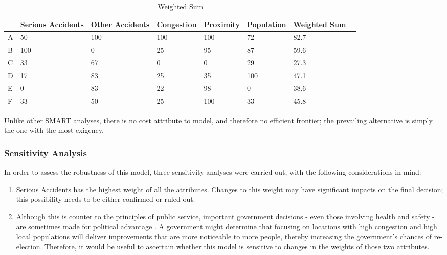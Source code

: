 \documentclass[11pt, a4paper]{article}
\begin{document}
    \begin{table}[!ht]
        \centering
        \begin{tabular}{|l|l|l|l|l|l|l|l|}
        \hline
            ~ & Serious Accidents & Other Accidents & Congestion & Proximity & Population & Weighted Sum   \\ \hline
            A & 50 & 100 & 100 & 100 & 72 & 82.7   \\ \hline
            B & 100 & 0 & 25 & 95 & 87 & 59.6   \\ \hline
            C & 33 & 67 & 0 & 0 & 29 & 27.3   \\ \hline
            D & 17 & 83 & 25 & 35 & 100 & 47.1   \\ \hline
            E & 0 & 83 & 22 & 98 & 0 & 38.6   \\ \hline
            F & 33 & 50 & 25 & 100 & 33 & 45.8   \\ \hline
        \end{tabular}
        \caption{Weighted Sum}
        \label{t10}
    \end{table}

    Unlike other SMART analyses, there is no cost attribute to model, and therefore no efficient frontier; the prevailing alternative is simply the one with the most exigency.

    \subsubsection{Sensitivity Analysis}

    In order to assess the robustness of this model, three sensitivity analyses were carried out, with the following considerations in mind:

    \begin{enumerate}
        \item Serious Accidents has the highest weight of all the attributes. Changes to this weight may have significant impacts on the final decision; this possibility needs to be either confirmed or ruled out.
        \item Although this is counter to the principles of public service, important government decisions - even those involving health and safety - are sometimes made for political advantage \parencite{a19}. A government might determine that focusing on locations with high congestion and high local populations will deliver improvements that are more noticeable to more people, thereby increasing the government's chances of re-election. Therefore, it would be useful to ascertain whether this model is sensitive to changes in the weights of those two attributes.
    \end{enumerate}
\end{document}
